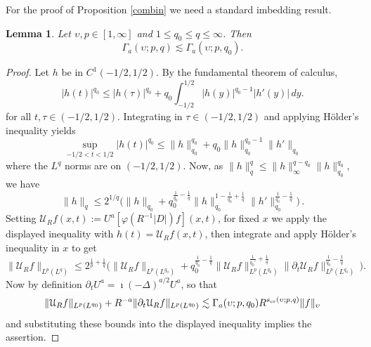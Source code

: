 \documentclass[11pt]{amsart}
\newtheorem{lemma}[theorem]{Lemma}
\theoremstyle{definition}
\numberwithin{theorem}{section}
\numberwithin{definition}{section}
\renewcommand{\wp}{\upsilon}
\def\scr{{s_{{\text{\rm cr}}}}}
\def\im{\imath}
\newcommand{\R}{\mathbb{R}}
\newcommand{\note}[1]{\footnote{\texttt{\Small #1}}}
\def\R{\mathbb R}
\def\lc{\lesssim}
\def\cU{{\mathcal {U}}}
\begin{document}
For the proof of Proposition
\ref{combin} we need  a standard imbedding result.
\begin{lemma}\label{bourg0}
Let $\wp, p\in [1,\infty]$ and $1\le q_0\le q\le\infty$. Then
$$\Gamma_a(\wp;p,q)\lc \Gamma_a(\wp;p,q_0).$$
\end{lemma}

\begin{proof} Let $h$ be in $C^1(-1/2,1/2)$. By the fundamental theorem
of calculus,
$$
|h(t)|^{q_0}\le |h(\tau)|^{q_0}+{q_0}\int_{-1/2}^{1/2} |h(y)|^{{q_0}-1}
|h'(y)|\,dy.
$$
for all $t,\tau\in (-1/2,1/2)$. Integrating in  $\tau\in (-1/2,1/2)$ and applying
H\"older's inequality yields
$$
\sup_{-1/2<t<1/2}|h(t)|^{q_0}\le \|h\|^{q_0}_{q_0}+q_0
\|h\|_{q_0}^{{q_0}-1}\|h'\|_{q_0}
$$
where the $L^q$ norms are on $(-1/2,1/2)$. Now, as $\|h\|^q_{q}\le \|h\|_{\infty}^{q-q_0}\|h\|_{q_0}^{q_0},$ we have
$$
\|h\|_{q} \le 2^{1/q}\Big(\|h\|_{q_0} + q_0^{\frac 1{q_0}-\frac 1q}
\|h\|_{q_0}^{1-\frac{1}{{q_0}}+\frac{1}{q}}\|h'\|_{q_0}^{\frac{1}{{q_0}}-\frac1q}\Big)\,.
$$
Setting $\cU_R f(x,t):=U^a[\varphi(R^{-1}|D|)f](x,t)$, for fixed $x$ we apply the displayed inequality  with
$h(t)= \cU_R f(x,t)$,
then integrate and apply H\"older's inequality in $x$ to get
$$
\|\cU_R f
\|_{L^p(L^q)}
\le 2^{\frac 1p+\frac 1q}
\Big(
\|\cU_R f\|_{L^p(L^{q_0})}+
q_0^{\frac 1{q_0}-\frac 1q}
\|\cU_R f\|_{L^p(L^{q_0})}^{\frac{1}{q_0'}+\frac{1}{q}}
\|\partial_t \cU_R f\|_{L^p(L^{q_0})}^{\frac{1}{q_0}-\frac1q}\,\Big).
$$
Now by definition $\partial_tU^a=\im(-\Delta)^{a/2}
U^a$, so that
$$\|\cU_R f\|_{L^p(L^{q_0})}
+ R^{-a}  \|\partial_t \cU_Rf\|_{L^p(L^{q_0})}
\lc\Gamma_a(\wp;p,q_0)
R^{\scr(\wp;p,q)}\|f\|_{\wp}
$$
and substituting these bounds
into  the displayed  inequality implies the assertion.
\end{proof}
\end{document}
